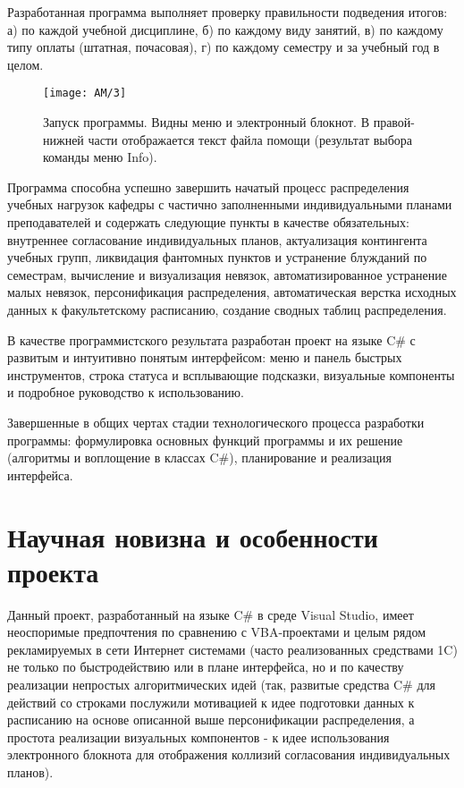 Разработанная программа выполняет проверку правильности подведения итогов: а) по каждой учебной дисциплине, б) по
каждому виду занятий, в) по каждому типу оплаты (штатная, почасовая), г) по каждому семестру и за учебный год в целом.

\begin{figure}[H]
	\centering
	\texttt{[image: AM/3]}
	\caption{Запуск программы. Видны меню и электронный блокнот. В правой-нижней части отображается текст файла помощи
		(результат выбора команды меню \foreignlanguage{english}{Info}).}
\end{figure}

Программа способна успешно завершить начатый процесс распределения учебных нагрузок кафедры с частично заполненными
индивидуальными планами преподавателей и содержать следующие пункты в качестве обязательных: внутреннее согласование
индивидуальных планов, актуализация контингента учебных групп, ликвидация фантомных пунктов и устранение блужданий по
семестрам, вычисление и визуализация невязок, автоматизированное устранение малых невязок, персонификация
распределения, автоматическая верстка исходных данных к факультетскому расписанию, создание сводных таблиц
распределения.

В качестве программистского результата разработан проект на языке C\# с развитым и интуитивно понятым интерфейсом: меню
и панель быстрых инструментов, строка статуса и всплывающие подсказки, визуальные компоненты и подробное руководство к
использованию.

Завершенные в общих чертах стадии технологического процесса разработки программы: формулировка основных функций
программы и их решение (алгоритмы и воплощение в классах C\#), планирование и реализация интерфейса.


\bigskip

\section{Научная новизна и особенности проекта}\label{AKM_ch3_3}
Данный проект, разработанный на языке C\# в среде Visual Studio, имеет неоспоримые
предпочтения по сравнению с VBA-проектами и целым рядом рекламируемых в сети Интернет системами (часто реализованных
средствами 1C) не только по быстродействию или в плане интерфейса, но и по качеству реализации непростых
алгоритмических идей (так, развитые средства C\# для действий со строками послужили мотивацией к идее подготовки данных
к расписанию на основе описанной выше персонификации распределения, а простота реализации визуальных компонентов - к
идее использования электронного блокнота для отображения коллизий согласования индивидуальных планов).

